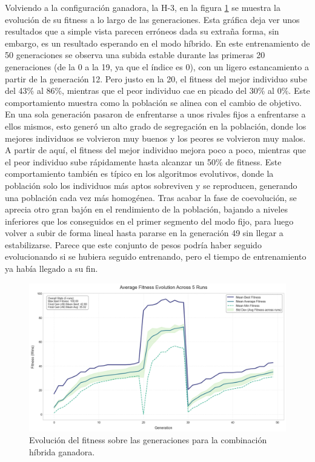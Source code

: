 Volviendo a la configuración ganadora, la H-3, en la figura \ref{fig:fitness_evolution_424} se muestra la evolución de su fitness a lo largo de las generaciones. Esta gráfica deja ver unos resultados que a simple vista parecen erróneos dada su extraña forma, sin embargo, es un resultado esperando en el modo híbrido. En este entrenamiento de 50 generaciones se observa una subida estable durante las primeras 20 generaciones (de la 0 a la 19, ya que el índice es 0), con un ligero estancamiento a partir de la generación 12. Pero justo en la 20, el fitness del mejor individuo sube del 43\% al 86\%, mientras que el peor individuo cae en picado del 30\% al 0\%. Este comportamiento muestra como la población se alinea con el cambio de objetivo. En una sola generación pasaron de enfrentarse a unos rivales fijos a enfrentarse a ellos mismos, esto generó un alto grado de segregación en la población, donde los mejores individuos se volvieron muy buenos y los peores se volvieron muy malos. A partir de aquí, el fitness del mejor individuo mejora poco a poco, mientras que el peor individuo sube rápidamente hasta alcanzar un 50\% de fitness. Este comportamiento también es típico en los algoritmos evolutivos, donde la población solo los individuos más aptos sobreviven y se reproducen, generando una población cada vez más homogénea. Tras acabar la fase de coevolución, se aprecia otro gran bajón en el rendimiento de la población, bajando a niveles inferiores que los conseguidos en el primer segmento del modo fijo, para luego volver a subir de forma lineal hasta pararse en la generación 49 sin llegar a estabilizarse. Parece que este conjunto de pesos podría haber seguido evolucionando si se hubiera seguido entrenando, pero el tiempo de entrenamiento ya había llegado a su fin.

\begin{figure}[H]
	\centering
	\includegraphics[width=1.0\textwidth]{img/424_fitness_evolution.png}
	\caption{Evolución del fitness sobre las generaciones para la combinación híbrida ganadora.}
	\label{fig:fitness_evolution_424}
\end{figure}

